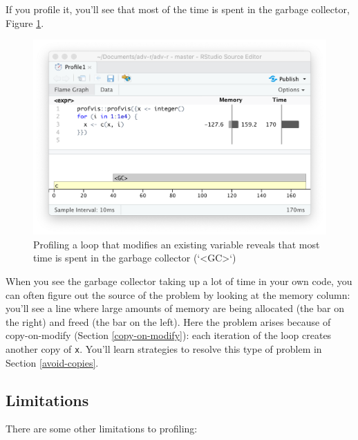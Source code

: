 \documentclass[]{book}
\begin{document}
If you profile it, you'll see that most of the time is spent in the garbage collector, Figure \ref{fig:perf-memory}.

\begin{figure}

{\centering \includegraphics[width=1\linewidth]{screenshots/performance/memory} 

}

\caption{Profiling a loop that modifies an existing variable reveals that most time is spent in the garbage collector (`<GC>`)}\label{fig:perf-memory}
\end{figure}

When you see the garbage collector taking up a lot of time in your own code, you can often figure out the source of the problem by looking at the memory column: you'll see a line where large amounts of memory are being allocated (the bar on the right) and freed (the bar on the left). Here the problem arises because of copy-on-modify (Section \ref{copy-on-modify}): each iteration of the loop creates another copy of \texttt{x}. You'll learn strategies to resolve this type of problem in Section \ref{avoid-copies}.

\hypertarget{limitations}{%
\subsection{Limitations}\label{limitations}}


There are some other limitations to profiling:
\end{document}
